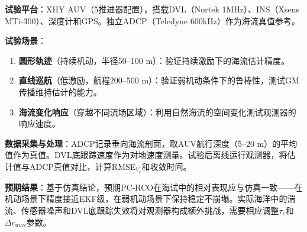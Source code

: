 \textbf{试验平台}：XHY AUV（5推进器配置），搭载DVL（Nortek 1MHz）、INS（Xsens MTi-300）、深度计和GPS。独立ADCP（Teledyne 600kHz）作为海流真值参考。

\textbf{试验场景}：
\begin{enumerate}
    \item \textbf{圆形轨迹}（持续机动，半径50--100 m）：验证持续激励下的海流估计精度。
    \item \textbf{直线巡航}（低激励，航程200--500 m）：验证弱机动条件下的鲁棒性，测试GM传播维持估计的能力。
    \item \textbf{海流变化响应}（穿越不同流场区域）：利用自然海流的空间变化测试观测器的响应速度。
\end{enumerate}

\textbf{数据采集与处理}：ADCP记录垂向海流剖面，取AUV航行深度（5--20 m）的平均值作为真值。DVL底跟踪速度作为对地速度测量。试验后离线运行观测器，将估计值与ADCP真值对比，计算RMSE$_{V_c}$和收敛时间。

\textbf{预期结果}：基于仿真结论，预期PC-RCO在海试中的相对表现应与仿真一致——在机动场景下精度接近EKF级，在弱机动场景下保持稳定不崩塌。实际海洋中的湍流、传感器噪声和DVL底跟踪失效将对观测器构成额外挑战，需要相应调整$\tau_c$和$\Delta c_{\max}$参数。
